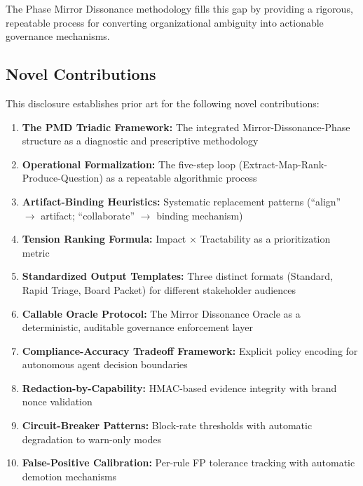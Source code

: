 \documentclass[11pt,a4paper]{article}
\begin{document}
The Phase Mirror Dissonance methodology fills this gap by providing a rigorous, repeatable process for converting organizational ambiguity into actionable governance mechanisms.

\subsection{Novel Contributions}

This disclosure establishes prior art for the following novel contributions:

\begin{enumerate}
\item \textbf{The PMD Triadic Framework:} The integrated Mirror-Dissonance-Phase structure as a diagnostic and prescriptive methodology

\item \textbf{Operational Formalization:} The five-step loop (Extract-Map-Rank-Produce-Question) as a repeatable algorithmic process

\item \textbf{Artifact-Binding Heuristics:} Systematic replacement patterns (``align'' $\rightarrow$ artifact; ``collaborate'' $\rightarrow$ binding mechanism)

\item \textbf{Tension Ranking Formula:} Impact $\times$ Tractability as a prioritization metric

\item \textbf{Standardized Output Templates:} Three distinct formats (Standard, Rapid Triage, Board Packet) for different stakeholder audiences

\item \textbf{Callable Oracle Protocol:} The Mirror Dissonance Oracle as a deterministic, auditable governance enforcement layer

\item \textbf{Compliance-Accuracy Tradeoff Framework:} Explicit policy encoding for autonomous agent decision boundaries

\item \textbf{Redaction-by-Capability:} HMAC-based evidence integrity with brand nonce validation

\item \textbf{Circuit-Breaker Patterns:} Block-rate thresholds with automatic degradation to warn-only modes

\item \textbf{False-Positive Calibration:} Per-rule FP tolerance tracking with automatic demotion mechanisms
\end{enumerate}
\end{document}

